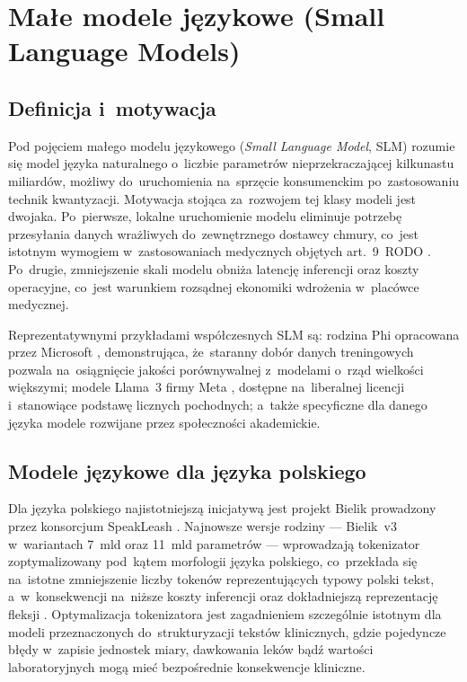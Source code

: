 \section{Małe modele językowe (Small Language Models)}\label{sec:slm}

\subsection{Definicja i~motywacja}

Pod pojęciem małego modelu językowego (\emph{Small Language Model},
SLM) rozumie się model języka naturalnego o~liczbie parametrów
nieprzekraczającej kilkunastu miliardów, możliwy do~uruchomienia
na~sprzęcie konsumenckim po~zastosowaniu technik kwantyzacji.
Motywacja stojąca za~rozwojem tej klasy modeli jest dwojaka.
Po~pierwsze, lokalne uruchomienie modelu eliminuje potrzebę
przesyłania danych wrażliwych do~zewnętrznego dostawcy chmury, co~jest
istotnym wymogiem w~zastosowaniach medycznych objętych
art.~9~RODO \parencite{gdpr2016}. Po~drugie, zmniejszenie skali
modelu obniża latencję inferencji oraz koszty operacyjne, co~jest
warunkiem rozsądnej ekonomiki wdrożenia w~placówce medycznej.

Reprezentatywnymi przykładami współczesnych SLM są: rodzina Phi
opracowana przez Microsoft \parencite{abdin2024phi3}, demonstrująca,
że~staranny dobór danych treningowych pozwala na~osiągnięcie jakości
porównywalnej z~modelami o~rząd wielkości większymi; modele Llama~3
firmy Meta \parencite{dubey2024llama3}, dostępne na~liberalnej
licencji i~stanowiące podstawę licznych pochodnych; a~także
specyficzne dla danego języka modele rozwijane przez społeczności
akademickie.

\subsection{Modele językowe dla języka polskiego}

Dla języka polskiego najistotniejszą inicjatywą jest projekt Bielik
prowadzony przez konsorcjum SpeakLeash \parencite{bielik2024}.
Najnowsze wersje rodziny --- Bielik~v3 w~wariantach 7~mld oraz
11~mld parametrów --- wprowadzają tokenizator zoptymalizowany pod~kątem
morfologii języka polskiego, co~przekłada się na~istotne zmniejszenie
liczby tokenów reprezentujących typowy polski tekst, a~w~konsekwencji
na~niższe koszty inferencji oraz dokładniejszą reprezentację
fleksji \parencite{bielikv3report}. Optymalizacja tokenizatora jest
zagadnieniem szczególnie istotnym dla modeli przeznaczonych
do~strukturyzacji tekstów klinicznych, gdzie pojedyncze błędy
w~zapisie jednostek miary, dawkowania leków bądź wartości
laboratoryjnych mogą mieć bezpośrednie konsekwencje kliniczne.

